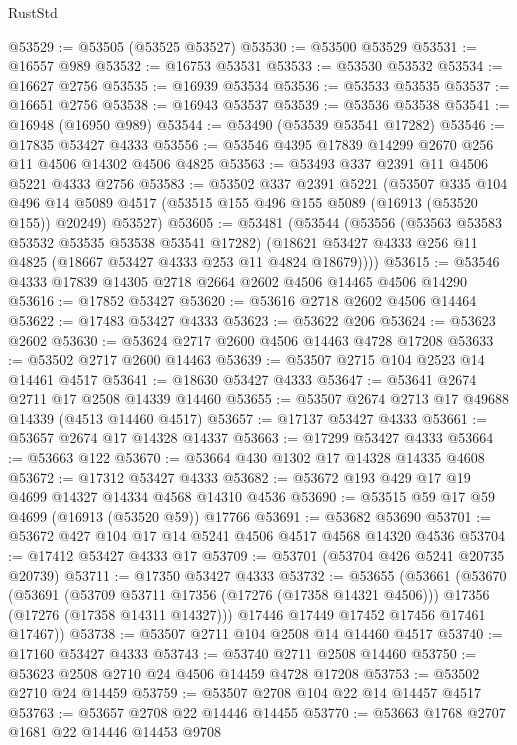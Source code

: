 \begin{lexlean}{RustStd}
\begin{coremodule}
@53529 := @53505 (@53525 @53527)
@53530 := @53500 @53529
@53531 := @16557 @989
@53532 := @16753 @53531
@53533 := @53530 @53532
@53534 := @16627 @2756
@53535 := @16939 @53534
@53536 := @53533 @53535
@53537 := @16651 @2756
@53538 := @16943 @53537
@53539 := @53536 @53538
@53541 := @16948 (@16950 @989)
@53544 := @53490 (@53539 @53541 @17282)
@53546 := @17835 @53427 @4333
@53556 := @53546 @4395 @17839 @14299 @2670 @256 @11 @4506 @14302 @4506 @4825
@53563 := @53493 @337 @2391 @11 @4506 @5221 @4333 @2756
@53583 := @53502
    @337
    @2391
    @5221
    (@53507
      @335
      @104
      @496
      @14
      @5089
      @4517
      (@53515 @155 @496 @155 @5089 (@16913 (@53520 @155)) @20249)
      @53527)
@53605 := @53481
    (@53544
      (@53556
        (@53563 @53583 @53532 @53535 @53538 @53541 @17282)
        (@18621 @53427 @4333 @256 @11 @4825 (@18667 @53427 @4333 @253 @11 @4824 @18679))))
@53615 := @53546 @4333 @17839 @14305 @2718 @2664 @2602 @4506 @14465 @4506 @14290
@53616 := @17852 @53427
@53620 := @53616 @2718 @2602 @4506 @14464
@53622 := @17483 @53427 @4333
@53623 := @53622 @206
@53624 := @53623 @2602
@53630 := @53624 @2717 @2600 @4506 @14463 @4728 @17208
@53633 := @53502 @2717 @2600 @14463
@53639 := @53507 @2715 @104 @2523 @14 @14461 @4517
@53641 := @18630 @53427 @4333
@53647 := @53641 @2674 @2711 @17 @2508 @14339 @14460
@53655 := @53507 @2674 @2713 @17 @49688 @14339 (@4513 @14460 @4517)
@53657 := @17137 @53427 @4333
@53661 := @53657 @2674 @17 @14328 @14337
@53663 := @17299 @53427 @4333
@53664 := @53663 @122
@53670 := @53664 @430 @1302 @17 @14328 @14335 @4608
@53672 := @17312 @53427 @4333
@53682 := @53672 @193 @429 @17 @19 @4699 @14327 @14334 @4568 @14310 @4536
@53690 := @53515 @59 @17 @59 @4699 (@16913 (@53520 @59)) @17766
@53691 := @53682 @53690
@53701 := @53672 @427 @104 @17 @14 @5241 @4506 @4517 @4568 @14320 @4536
@53704 := @17412 @53427 @4333 @17
@53709 := @53701 (@53704 @426 @5241 @20735 @20739)
@53711 := @17350 @53427 @4333
@53732 := @53655
    (@53661
      (@53670
        (@53691
          (@53709 @53711 @17356 (@17276 (@17358 @14321 @4506)))
          @17356
          (@17276 (@17358 @14311 @14327)))
        @17446
        @17449
        @17452
        @17456
        @17461
        @17467))
@53738 := @53507 @2711 @104 @2508 @14 @14460 @4517
@53740 := @17160 @53427 @4333
@53743 := @53740 @2711 @2508 @14460
@53750 := @53623 @2508 @2710 @24 @4506 @14459 @4728 @17208
@53753 := @53502 @2710 @24 @14459
@53759 := @53507 @2708 @104 @22 @14 @14457 @4517
@53763 := @53657 @2708 @22 @14446 @14455
@53770 := @53663 @1768 @2707 @1681 @22 @14446 @14453 @9708

\end{coremodule}
\end{lexlean}
